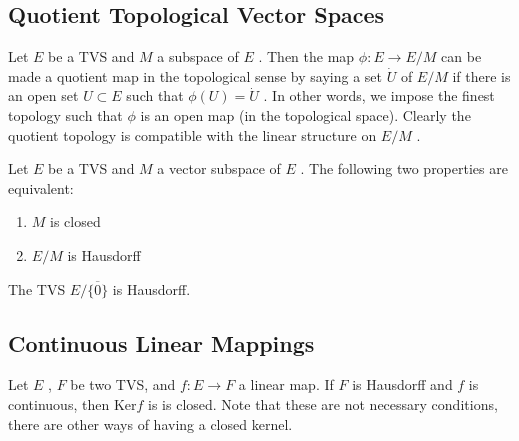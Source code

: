 \subsection{Quotient Topological Vector Spaces}

Let $ E $ be a TVS and $ M $ a subspace of $ E $ . Then the map $ \phi: E \to E/M $ can be made a quotient map in the topological sense by saying a set $ \dot{U} $ of $ E/M $ if there is an open set $ U \subset E $ such that $ \phi(U) = \dot{U} $ . In other words, we impose the finest topology such that $ \phi $ is an open map (in the topological space). Clearly the quotient topology is compatible with the linear structure on $ E/M $ .

\begin{prop}
	Let $ E $ be a TVS and $ M $ a vector subspace of $ E $ . The following two properties are equivalent:
	\begin{enumerate}
		\item $ M $ is closed
		\item $ E/M $ is Hausdorff
	\end{enumerate}
	
\end{prop}

\begin{cor}
	The TVS $ E/ \overline{ \{ 0 \} } $ is Hausdorff.
\end{cor}


\subsection{Continuous Linear Mappings}
\indent Let $ E $ , $ F $ be two TVS, and $ f: E \to F $ a linear map. If $ F $ is Hausdorff and $ f $ is continuous, then $ \mathrm{ Ker }f $ is is closed. Note that these are not necessary conditions, there are other ways of having a closed kernel.



